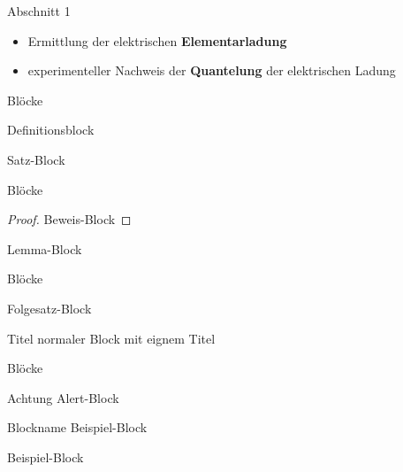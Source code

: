 
\begin{frame}[t]{Abschnitt 1}
    \begin{itemize}
        \item Ermittlung der elektrischen \textbf{Elementarladung} 
        \item experimenteller Nachweis der \textbf{Quantelung} der elektrischen Ladung
    \end{itemize}
\end{frame}

\begin{frame}{Blöcke}
    \begin{definition}
        Definitionsblock
    \end{definition}
    \pause
    \vspace{1em}
    \begin{theorem}
        Satz-Block
    \end{theorem}
\end{frame}

\begin{frame}{Blöcke}
    \begin{proof}
        Beweis-Block
    \end{proof}
    \vspace{1em}
    \begin{lemma}
        Lemma-Block
    \end{lemma}
\end{frame}

\begin{frame}{Blöcke}
    \begin{corollary}
        Folgesatz-Block
    \end{corollary}
    \vspace{1em}
    \begin{block}{Titel}
        normaler Block mit eignem Titel
    \end{block}
\end{frame}

\begin{frame}{Blöcke}
    \begin{alertblock}{Achtung}
        Alert-Block
    \end{alertblock}
    \begin{exampleblock}{Blockname}
        Beispiel-Block
    \end{exampleblock}
    \begin{example}
        Beispiel-Block
    \end{example}
\end{frame}

